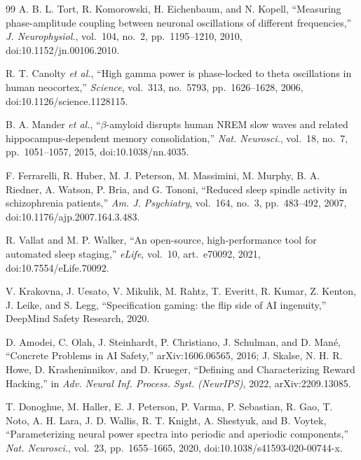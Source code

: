 \documentclass[conference]{IEEEtran}
\begin{document}
\begin{thebibliography}{99}
 A. B. L. Tort, R. Komorowski, H. Eichenbaum, and N. Kopell,
``Measuring phase-amplitude coupling between neuronal oscillations of different
frequencies,'' \emph{J. Neurophysiol.}, vol.~104, no.~2, pp.~1195--1210, 2010,
doi:10.1152/jn.00106.2010.

 R. T. Canolty \emph{et al.}, ``High gamma power is
phase-locked to theta oscillations in human neocortex,'' \emph{Science},
vol.~313, no.~5793, pp.~1626--1628, 2006, doi:10.1126/science.1128115.

 B. A. Mander \emph{et al.}, ``$\beta$-amyloid disrupts
human NREM slow waves and related hippocampus-dependent memory consolidation,''
\emph{Nat. Neurosci.}, vol.~18, no.~7, pp.~1051--1057, 2015,
doi:10.1038/nn.4035.

 F. Ferrarelli, R. Huber, M. J. Peterson, M. Massimini,
M. Murphy, B. A. Riedner, A. Watson, P. Bria, and G. Tononi, ``Reduced sleep
spindle activity in schizophrenia patients,'' \emph{Am. J. Psychiatry},
vol.~164, no.~3, pp.~483--492, 2007, doi:10.1176/ajp.2007.164.3.483.

 R. Vallat and M. P. Walker, ``An open-source,
high-performance tool for automated sleep staging,'' \emph{eLife}, vol.~10,
art.~e70092, 2021, doi:10.7554/eLife.70092.

 V. Krakovna, J. Uesato, V. Mikulik, M. Rahtz,
T. Everitt, R. Kumar, Z. Kenton, J. Leike, and S. Legg, ``Specification gaming:
the flip side of AI ingenuity,'' DeepMind Safety Research, 2020.

 D. Amodei, C. Olah, J. Steinhardt, P. Christiano,
J. Schulman, and D. Man\'e, ``Concrete Problems in AI Safety,''
arXiv:1606.06565, 2016; J. Skalse, N. H. R. Howe, D. Krasheninnikov, and
D. Krueger, ``Defining and Characterizing Reward Hacking,'' in \emph{Adv. Neural
Inf. Process. Syst. (NeurIPS)}, 2022, arXiv:2209.13085.

 T. Donoghue, M. Haller, E. J. Peterson, P. Varma,
P. Sebastian, R. Gao, T. Noto, A. H. Lara, J. D. Wallis, R. T. Knight,
A. Shestyuk, and B. Voytek, ``Parameterizing neural power spectra into periodic
and aperiodic components,'' \emph{Nat. Neurosci.}, vol.~23, pp.~1655--1665,
2020, doi:10.1038/s41593-020-00744-x.

\end{thebibliography}
\end{document}
